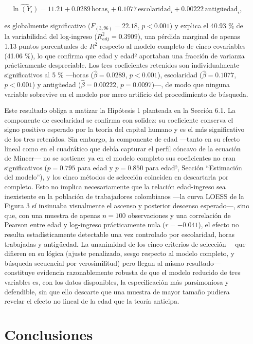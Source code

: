 \documentclass[
  spanish,
  letterpaper,
  DIV=11,
  numbers=noendperiod]{scrartcl}
\begin{document}
\[\widehat{\ln(Y_i)} = 11.21 + 0.0289\,\text{horas}_i + 0.1077\,\text{escolaridad}_i + 0.00222\,\text{antigüedad}_i,\]

es globalmente significativo (\(F_{(3,96)}=22.18\), \(p<0.001\)) y
explica el 40.93 \% de la variabilidad del log-ingreso
(\(R^2_{adj}=0.3909\)), una pérdida marginal de apenas 1.13 puntos
porcentuales de \(R^2\) respecto al modelo completo de cinco covariables
(41.06 \%), lo que confirma que edad y edad² aportaban una fracción de
varianza prácticamente despreciable. Los tres coeficientes retenidos son
individualmente significativos al 5 \% ---horas (\(\hat\beta=0.0289\),
\(p<0.001\)), escolaridad (\(\hat\beta=0.1077\), \(p<0.001\)) y
antigüedad (\(\hat\beta=0.00222\), \(p=0.0097\))---, de modo que ninguna
variable sobrevive en el modelo por mero artificio del procedimiento de
búsqueda.

Este resultado obliga a matizar la Hipótesis 1 planteada en la Sección
6.1. La componente de escolaridad se confirma con solidez: su
coeficiente conserva el signo positivo esperado por la teoría del
capital humano y es el más significativo de los tres retenidos. Sin
embargo, la componente de edad ---tanto en su efecto lineal como en el
cuadrático que debía capturar el perfil cóncavo de la ecuación de
Mincer--- no se sostiene: ya en el modelo completo sus coeficientes no
eran significativos (\(p=0.795\) para edad y \(p=0.850\) para edad²,
Sección ``Estimación del modelo''), y los cinco métodos de selección
coinciden en descartarla por completo. Esto no implica necesariamente
que la relación edad-ingreso sea inexistente en la población de
trabajadores colombianos ---la curva LOESS de la Figura 3 sí insinuaba
visualmente el ascenso y posterior descenso esperado---, sino que, con
una muestra de apenas \(n=100\) observaciones y una correlación de
Pearson entre edad y log-ingreso prácticamente nula (\(r=-0.041\)), el
efecto no resulta estadísticamente detectable una vez controlado por
escolaridad, horas trabajadas y antigüedad. La unanimidad de los cinco
criterios de selección ---que difieren en su lógica (ajuste penalizado,
sesgo respecto al modelo completo, y búsqueda secuencial por
verosimilitud) pero llegan al mismo resultado--- constituye evidencia
razonablemente robusta de que el modelo reducido de tres variables es,
con los datos disponibles, la especificación más parsimoniosa y
defendible, sin que ello descarte que una muestra de mayor tamaño
pudiera revelar el efecto no lineal de la edad que la teoría anticipa.

\section{Conclusiones}\label{conclusiones}
\end{document}

